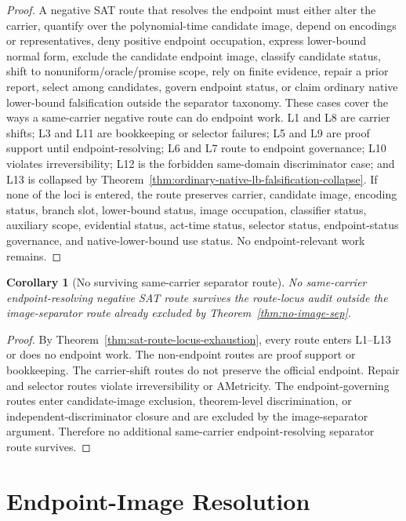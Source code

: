 \documentclass[11pt]{article}
\newtheorem{corollary}[theorem]{Corollary}
\theoremstyle{definition}
\theoremstyle{remark}
\begin{document}
\begin{proof}
A negative SAT route that resolves the endpoint must either alter the carrier, quantify over the polynomial-time candidate image, depend on encodings or representatives, deny positive endpoint occupation, express lower-bound normal form, exclude the candidate endpoint image, classify candidate status, shift to nonuniform/oracle/promise scope, rely on finite evidence, repair a prior report, select among candidates, govern endpoint status, or claim ordinary native lower-bound falsification outside the separator taxonomy. These cases cover the ways a same-carrier negative route can do endpoint work. L1 and L8 are carrier shifts; L3 and L11 are bookkeeping or selector failures; L5 and L9 are proof support until endpoint-resolving; L6 and L7 route to endpoint governance; L10 violates irreversibility; L12 is the forbidden same-domain discriminator case; and L13 is collapsed by Theorem~\ref{thm:ordinary-native-lb-falsification-collapse}. If none of the loci is entered, the route preserves carrier, candidate image, encoding status, branch slot, lower-bound status, image occupation, classifier status, auxiliary scope, evidential status, act-time status, selector status, endpoint-status governance, and native-lower-bound use status. No endpoint-relevant work remains.
\end{proof}

\begin{corollary}[No surviving same-carrier separator route]\label{cor:no-surviving-sat-separator-route}
No same-carrier endpoint-resolving negative SAT route survives the route-locus audit outside the image-separator route already excluded by Theorem~\ref{thm:no-image-sep}.
\end{corollary}

\begin{proof}
By Theorem~\ref{thm:sat-route-locus-exhaustion}, every route enters L1--L13 or does no endpoint work. The non-endpoint routes are proof support or bookkeeping. The carrier-shift routes do not preserve the official endpoint. Repair and selector routes violate irreversibility or AMetricity. The endpoint-governing routes enter candidate-image exclusion, theorem-level discrimination, or independent-discriminator closure and are excluded by the image-separator argument. Therefore no additional same-carrier endpoint-resolving separator route survives.
\end{proof}

\section{Endpoint-Image Resolution}\label{sec:final}
\end{document}
